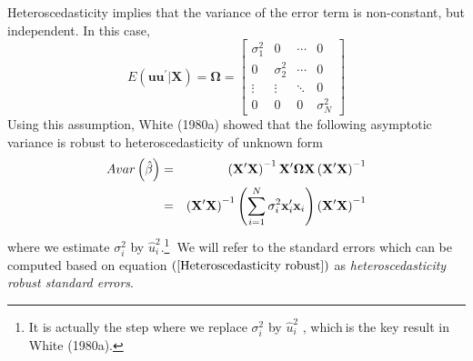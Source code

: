 \documentclass{article}
\begin{document}
Heteroscedasticity implies that the variance of the error term is
non-constant, but independent. In this case,%
\begin{equation*}
E\left( \mathbf{uu}^{\prime }|\mathbf{X}\right) =\mathbf{\Omega }=\left[ 
\begin{array}{cccc}
\sigma _{1}^{2} & 0 & \cdots & 0 \\ 
0 & \sigma _{2}^{2} & \cdots & 0 \\ 
\vdots & \vdots & \ddots & 0 \\ 
0 & 0 & 0 & \sigma _{N}^{2}%
\end{array}%
\right]
\end{equation*}%
Using this assumption, White (1980a) showed that the following asymptotic
variance is robust to heteroscedasticity of unknown form%
\begin{eqnarray}
Avar\left( \hat{\beta}\right) &=&\left( \mathbf{X}^{\prime }\mathbf{X}%
\right) ^{-1}\mathbf{X}^{\prime }\mathbf{\Omega X}\left( \mathbf{X}^{\prime }%
\mathbf{X}\right) ^{-1}  \notag \\
&=&\left( \mathbf{X}^{\prime }\mathbf{X}\right) ^{-1}\left( \sum_{i=1}^{N}%
\mathbf{\sigma }_{i}^{2}\mathbf{x}_{i}^{\prime }\mathbf{x}_{i}\right) \left( 
\mathbf{X}^{\prime }\mathbf{X}\right) ^{-1}
\label{Heteroscedasticity robust}
\end{eqnarray}%
where we estimate $\sigma _{i}^{2}$ by $\hat{u}_{i}^{2}$.\footnote{%
It is actually the step where we replace $\sigma _{i}^{2}$ by $\hat{u}%
_{i}^{2}$ , which$\ $is the key result in White (1980a).}\textbf{\ }We will
refer to the standard errors which can be computed based on equation $\left( %
\ref{Heteroscedasticity robust}\right) $ as \emph{heteroscedasticity robust
standard errors}.
\end{document}
